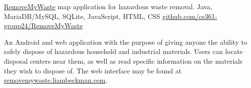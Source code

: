 \showoff
{\href{https://removemywaste.liambeckman.com/}{RemoveMyWaste}}
{map application for hazardous waste removal.}
{Java, MariaDB/MySQL, SQLite, JavaScript, HTML, CSS}
{\href{https://github.com/cs361-group24/RemoveMyWaste}{github.com/cs361-group24/RemoveMyWaste}}

An Android and web application with the purpose of giving anyone the ability to safely dispose of hazardous household and industrial materials. Users can locate disposal centers near them, as well as read specific information on the materials they wish to dispose of. The web interface may be found at \textcolor{my-blue}{\href{https://removemywaste.liambeckman.com}{removemywaste.liambeckman.com}}.

\myBreak
